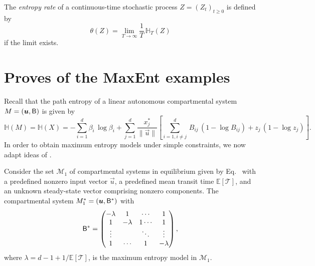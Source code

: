 \documentclass[smallextended]{svjour3}
\makeatletter
\renewcommand*{\eqref}[1]{%
  \hyperref[{#1}]{\textup{\tagform@{\ref*{#1}}}}%
}
\newcommand{\E}{\mathbb{E}}
\newcommand{\TT}{\mathcal{T}}
\renewcommand{\H}{\mathbb{H}}
\newcommand{\suml}{\sum\limits}
\newcommand{\liml}{\lim\limits}
\newcommand{\vnorms}[1]{\|#1\|}
\makeatother
\begin{document}
\begin{definition}%
	The \emph{entropy rate} of a continuous-time stochastic process $Z=(Z_t)_{t\geq0}$ is defined by
	\begin{equation*}
		\theta(Z) = \liml_{T\to\infty} \frac{1}{T}\,\H_T(Z)
	\end{equation*}
	if the limit exists.
\end{definition}


\section{Proves of the MaxEnt examples}
	Recall that the path entropy of a linear autonomous compartmental system $M=(\vec{u},\tens{B})$ is given by
	\begin{equation*}
		\H(M) = \H(X) = -\suml_{i=1}^d\beta_i\,\log\beta_i + \suml_{j=1}^d \frac{x^\ast_j}{\vnorms{\vec{u}}}\left[\suml_{i=1,i\neq j}^d \,B_{ij}\,(1-\log B_{ij}) + z_j\,(1-\log z_j)\right].
	\end{equation*}
	In order to obtain maximum entropy models under simple constraints, we now adapt ideas of \cite{Girardin2004MCAP}.

	\begin{proposition}
    \label{proposition:max_ent_example_1}
		Consider the set $\mathcal{M}_1$ of compartmental systems in equilibrium given by Eq.~\eqref{eqn:lin_CS_sys}  with a predefined nonzero input vector $\vec{u}$, a predefined mean transit time $\E\left[\TT\right]$, and an unknown steady-state vector comprising nonzero components.
		The compartmental system $M^\ast_1=(\vec{u},\tens{B}^\ast)$ with 
		\begin{equation*}
			\mathsf{B}^\ast = \begin{pmatrix}
									-\lambda & 1 & \cdots & 1\\
									1 & -\lambda & 1 \cdots & 1 \\
									\vdots & & \ddots & \vdots\\
									1 & \cdots & 1 & -\lambda
             \end{pmatrix},
		\end{equation*}
		where $\lambda=d-1+1/\E\left[\TT\right]$, 		
		is the maximum entropy model in $\mathcal{M}_1$.
	\end{proposition}
\end{document}
